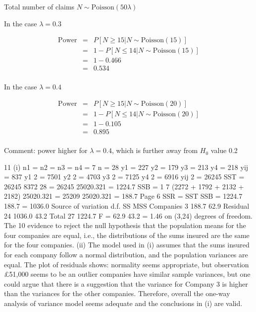 \documentclass[a4paper,12pt]{article}
\begin{document}
Total number of claims $N \sim \mbox{Poisson}(50 \lambda)$

In the case $\lambda = 0.3$

\begin{eqnarray*}
\mbox{Power} 
&=& P[N \geq 15| N \sim \mbox{Poisson}(15)]\\
&=& 1 -  P[N \leq 14|  N \sim \mbox{Poisson}(15)]\\
&=& 1 - 0.466\\
&=& 0.534 \\
\end{eqnarray*}

In the case $\lambda = 0.4$

\begin{eqnarray*}
\mbox{Power} 
&=& P[N \geq 15| N \sim \mbox{Poisson}(20)]\\
&=& 1 -  P[N \leq 14|  N \sim \mbox{Poisson}(20)]\\
&=& 1 - 0.105  \\
&=& 0.895 \\
\end{eqnarray*}

Comment: power higher for
$\lambda = 0.4$, which is further away from $H_0$ value 0.2

11 (i) n1 = n2 = n3 = n4 = 7 n = 28
y1 = 227 y2 = 179 y3 = 213 y4 = 218 yij = 837
y1
2 = 7501 y2
2 = 4703 y3
2 = 7125 y4
2 = 6916 yij
2 = 26245
SST = 26245
8372
28
= 26245 25020.321 = 1224.7
SSB =
1
7
(2272 + 1792 + 2132 + 2182) 25020.321
= 25209 25020.321 = 188.7
Page 6
SSR = SST SSB = 1224.7 188.7 = 1036.0
Source of variation d.f. SS MSS
Companies 3 188.7 62.9
Residual 24 1036.0 43.2
Total 27 1224.7
F =
62.9
43.2
= 1.46 on (3,24) degrees of freedom.
The 10%
evidence to reject the null hypothesis that the population means for the four
companies are equal, i.e., the distributions of the sums insured are the same for
the four companies.
(ii) The model used in (i) assumes that the sums insured for each company follow
a normal distribution, and the population variances are equal.
The plot of residuals shows:
normality seems appropriate, but observation £51,000 seems to be an
outlier
companies have similar sample variances, but one could argue that there is
a suggestion that the variance for Company 3 is higher than the variances
for the other companies.
Therefore, overall the one-way analysis of variance model seems adequate and
the conclusions in (i) are valid.
\end{document}
